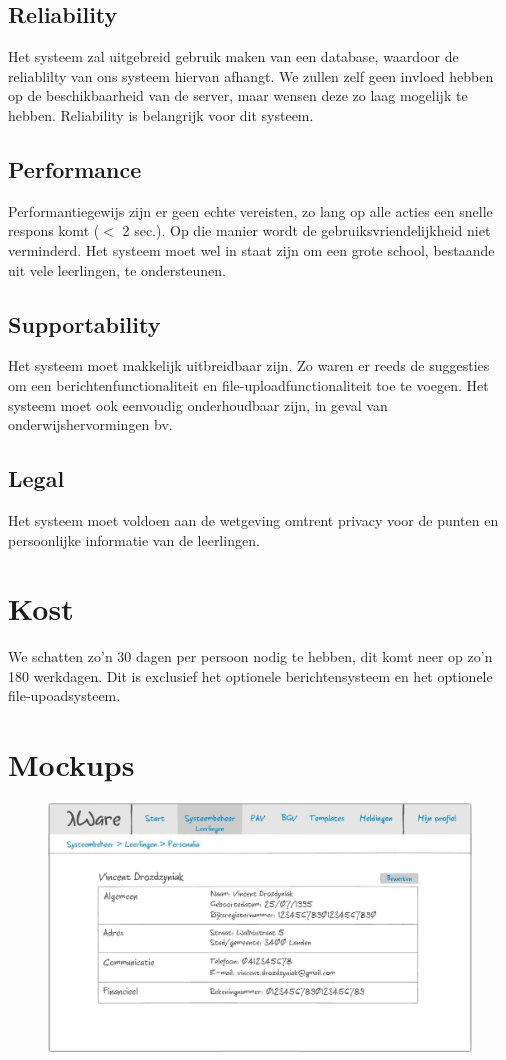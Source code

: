\documentclass[a4paper]{article}
\begin{document}
\subsection{Reliability}
Het systeem zal uitgebreid gebruik maken van een database, waardoor de reliablilty van ons systeem hiervan afhangt. We zullen zelf geen invloed hebben op de beschikbaarheid van de server, maar wensen deze zo laag mogelijk te hebben. Reliability is belangrijk voor dit systeem.

\subsection{Performance}
Performantiegewijs zijn er geen echte vereisten, zo lang op alle acties een snelle respons komt ($<$ 2 sec.). Op die manier wordt de gebruiksvriendelijkheid niet verminderd. Het systeem moet wel in staat zijn om een grote school, bestaande uit vele leerlingen, te ondersteunen.

\subsection{Supportability}
Het systeem moet makkelijk uitbreidbaar zijn. Zo waren er reeds de suggesties om een berichtenfunctionaliteit en file-uploadfunctionaliteit toe te voegen. Het systeem moet ook eenvoudig onderhoudbaar zijn, in geval van onderwijshervormingen bv.

\subsection{Legal}
Het systeem moet voldoen aan de wetgeving omtrent privacy voor de punten en persoonlijke informatie van de leerlingen.


\section{Kost}
We schatten zo'n 30 dagen per persoon nodig te hebben, dit komt neer op zo'n 180 werkdagen. Dit is exclusief het optionele berichtensysteem en het optionele file-upoadsysteem.

\section{Mockups}
\begin{figure}[H]
\centering
  \includegraphics[width=1.0\linewidth]{deeltijdsonderwijs_mockup.JPG}
\end{figure}
\end{document}
